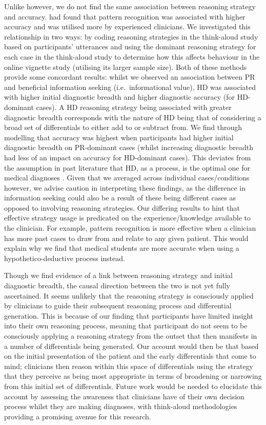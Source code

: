 \documentclass[a4paper, nobind]{templates/ociamthesis}
\begin{document}
Unlike \textcite{coderre_diagnostic_2003} however, we do not find the same association between reasoning strategy and accuracy. \textcite{coderre_diagnostic_2003} had found that pattern recognition was associated with higher accuracy and was utilised more by experienced clinicians. We investigated this relationship in two ways: by coding reasoning strategies in the think-aloud study based on participants' utterances and using the dominant reasoning strategy for each case in the think-aloud study to determine how this affects behaviour in the online vignette study (utilising its larger sample size). Both of these methods provide some concordant results: whilst we observed an association between PR and beneficial information seeking (i.e.~informational value), HD was associated with higher initial diagnostic breadth and higher diagnostic accuracy (for HD-dominant cases). A HD reasoning strategy being associated with greater diagnostic breadth corresponds with the nature of HD being that of considering a broad set of differentials to either add to or subtract from. We find through modelling that accuracy was highest when participants had higher initial diagnostic breadth on PR-dominant cases (whilst increasing diagnostic breadth had less of an impact on accuracy for HD-dominant cases). This deviates from the assumption in past literature that HD, as a process, is the optimal one for medical diagnoses \autocite{kuipers_causal_1984,higgs_clinical_2019}. Given that we averaged across individual cases/conditions however, we advise caution in interpreting these findings, as the difference in information seeking could also be a result of these being different cases as opposed to involving reasoning strategies. Our differing results to \textcite{coderre_diagnostic_2003} hint that effective strategy usage is predicated on the experience/knowledge available to the clinician. For example, pattern recognition is more effective when a clinician has more past cases to draw from and relate to any given patient. This would explain why we find that medical students are more accurate when using a hypothetico-deductive process instead.

Though we find evidence of a link between reasoning strategy and initial diagnostic breadth, the causal direction between the two is not yet fully ascertained. It seems unlikely that the reasoning strategy is consciously applied by clinicians to guide their subsequent reasoning process and differential generation. This is because of our finding that participants have limited insight into their own reasoning process, meaning that participant do not seem to be consciously applying a reasoning strategy from the outset that then manifests in a number of differentials being generated. Our account would then be that based on the initial presentation of the patient and the early differentials that come to mind; clinicians then reason within this space of differentials using the strategy that they perceive as being most appropriate in terms of broadening or narrowing from this initial set of differentials. Future work would be needed to elucidate this account by assessing the awareness that clinicians have of their own decision process whilst they are making diagnoses, with think-aloud methodologies providing a promising avenue for this research.
\end{document}
